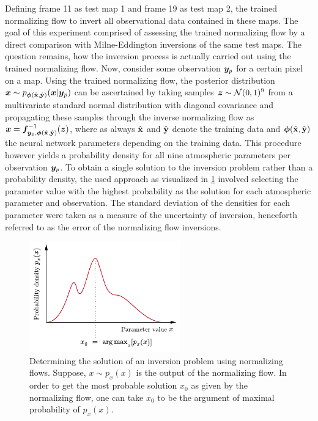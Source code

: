 \documentclass[a4paper,11pt]{report}
\def\fc#1{{\color{black}{#1}}} %
\begin{document}
Defining frame 11 as test map 1 and frame 19 as test map 2, the trained normalizing flow \fc{was used} to invert all observational data contained in these maps. The goal of this experiment comprised of assessing the trained normalizing flow by a direct comparison with Milne-Eddington inversions of the same test maps. The question remains, how the inversion process is actually carried out using the trained normalizing flow. Now, consider some observation $\bm{y}_{p}$ for a certain pixel on a map. Using the trained normalizing flow, the posterior distribution $\bm{x} \sim p_{\bm{\phi}(\hat{\boldsymbol{\mathbf{x}}},\hat{\boldsymbol{\mathbf{y}}})}(\bm{x}|\bm{y}_p)$ can be ascertained by taking samples $\bm{z} \sim \mathcal{N}(0,1)^9$ from a multivariate standard normal distribution with diagonal covariance and propagating these samples through the inverse normalizing flow as $\bm{x} = \bm{f}_{\bm{y}_p,\bm{\phi}(\hat{\boldsymbol{\mathbf{x}}},\hat{\boldsymbol{\mathbf{y}}})}^{-1}(\bm{z})$, where as always $\hat{\boldsymbol{\mathbf{x}}}$ and $\hat{\boldsymbol{\mathbf{y}}}$ denote the training data and $\bm{\phi}(\hat{\boldsymbol{\mathbf{x}}},\hat{\boldsymbol{\mathbf{y}}})$ the neural network parameters depending on the training data. This procedure however yields a probability density for all nine atmospheric parameters per observation $\bm{y}_p$. To obtain a single solution to the inversion problem rather than a probability density, the used approach as visualized in \cref{fig:argmax} involved selecting the parameter value with the highest probability as the solution for each atmospheric parameter and observation. The standard deviation of the densities for each parameter were taken as a measure of the uncertainty of inversion, henceforth referred to as the error of the normalizing flow inversions.
\begin{figure}[h!]
\centering
\includegraphics[width=6.5cm]{figures/argmax.pdf}
\caption{Determining the solution of an inversion problem using normalizing flows. Suppose, $x \sim p_x(x)$ is the output of the normalizing flow. In order to get the most probable solution $x_0$ as given by the normalizing flow, one can take $x_0$ to be the argument of maximal probability of $p_x(x)$.}
\label{fig:argmax}
\end{figure}
\end{document}
